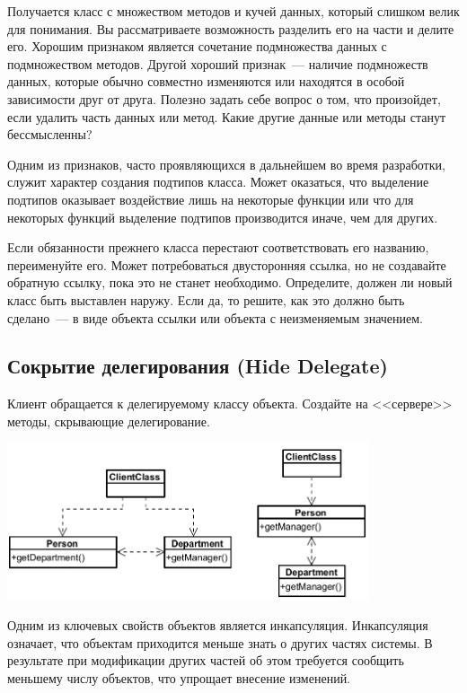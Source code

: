 \documentclass{../../text-style}
\begin{document}
Получается класс с множеством методов и кучей данных, который слишком велик для понимания. Вы рассматриваете возможность разделить его на части и делите его. Хорошим признаком является сочетание подмножества данных с подмножеством методов. Другой хороший признак~--- наличие подмножеств данных, которые обычно совместно изменяются или находятся в особой зависимости друг от друга. Полезно задать себе вопрос о том, что произойдет, если удалить часть данных или метод. Какие другие данные или методы станут бессмысленны?

Одним из признаков, часто проявляющихся в дальнейшем во время разработки, служит характер создания подтипов класса. Может оказаться, что выделение подтипов оказывает воздействие лишь на некоторые функции или что для некоторых функций выделение подтипов производится иначе, чем для других.

Если обязанности прежнего класса перестают соответствовать его названию, переименуйте его. Может потребоваться двусторонняя ссылка, но не создавайте обратную ссылку, пока это не станет необходимо. Определите, должен ли новый класс быть выставлен наружу. Если да, то решите, как это должно быть сделано~--- в виде объекта ссылки или объекта с неизменяемым значением.

\subsection{Сокрытие делегирования (Hide Delegate)}

Клиент обращается к делегируемому классу объекта. Создайте на <<сервере>> методы, скрывающие делегирование.

\begin{center}
    \includegraphics[width=0.8\textwidth]{hideDelegate.png}
\end{center}

Одним из ключевых свойств объектов является инкапсуляция. Инкапсуляция означает, что объектам приходится меньше знать о других частях системы. В результате при модификации других частей об этом требуется сообщить меньшему числу объектов, что упрощает внесение изменений.
\end{document}
